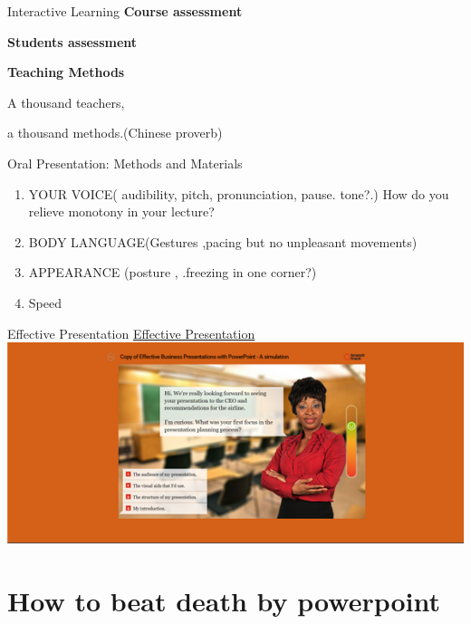\documentclass[
  ignorenonframetext,
]{beamer}
\begin{document}
\begin{frame}{Interactive Learning}
\protect\hypertarget{interactive-learning}{}
\textbf{Course assessment}

\textbf{Students assessment}

{\textbf{Teaching Methods}}

A thousand teachers,

a thousand methods.(Chinese proverb)
\end{frame}

\begin{frame}{Oral Presentation: Methods and Materials}
\protect\hypertarget{oral-presentation-methods-and-materials}{}
\begin{enumerate}[<+->]
\item
  {YOUR VOICE}( audibility, pitch, pronunciation, pause. tone?.) How do
  you relieve monotony in your lecture?
\item
  {BODY LANGUAGE}(Gestures ,pacing but no unpleasant movements)
\item
  {APPEARANCE} (posture , .freezing in one corner?)
\item
  {Speed}
\end{enumerate}
\end{frame}

\begin{frame}{Effective Presentation}
\protect\hypertarget{effective-presentation}{}
\href{https://www.branchtrack.com/projects/bv28y7r3}{Effective
Presentation} \includegraphics{images/presentation_sim.png}
\end{frame}

\hypertarget{how-to-beat-death-by-powerpoint}{%
\section{How to beat death by
powerpoint}\label{how-to-beat-death-by-powerpoint}}
\end{document}
